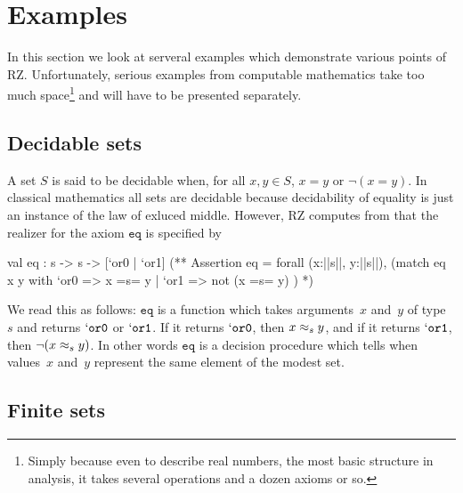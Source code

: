 \section{Examples}
\label{sec:examples}

In this section we look at serveral examples which demonstrate various
points of RZ. Unfortunately, serious examples from computable
mathematics take too much space\footnote{Simply because even to
  describe real numbers, the most basic structure in analysis, it
  takes several operations and a dozen axioms or so.} and will have to
be presented separately.

\subsection{Decidable sets}
\label{sec:decidable-sets}

A set $S$ is said to be decidable when, for all $x, y \in S$, $x = y$
or $\lnot (x = y)$. In classical mathematics all sets are decidable
because decidability of equality is just an instance of the law of
exluced middle. However, RZ computes from
%
%
that the realizer for the axiom $\mathtt{eq}$ is specified by
%
\begin{source}
val eq : s -> s -> [`or0 | `or1]
(**  Assertion eq =
       forall (x:||s||, y:||s||),
         (match eq x y with
            `or0 => x =s= y
          | `or1 => not (x =s= y)
          )
*)
\end{source}
%
We read this as follows: $\mathtt{eq}$ is a function which takes
arguments~$x$ and~$y$ of type~$s$ and returns $\mathtt{`or0}$ or
$\mathtt{`or1}$. If it returns $\mathtt{`or0}$, then $x \approx_s y$, and
if it returns $\mathtt{`or1}$, then $\lnot (x \approx_s y)$. In other
words $\mathtt{eq}$ is a decision procedure which tells when
values~$x$ and~$y$ represent the same element of the modest set.


\subsection{Finite sets}
\label{sec:finite-sets}

